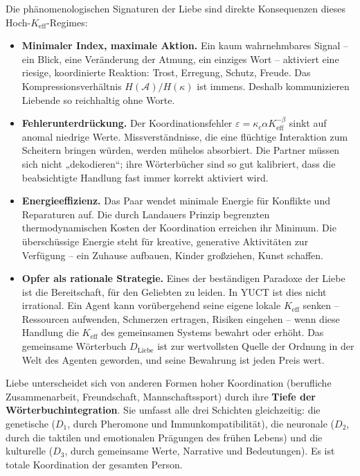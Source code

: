 \documentclass[12pt,a4paper]{article}
\begin{document}
	Die phänomenologischen Signaturen der Liebe sind direkte Konsequenzen dieses Hoch-\(K_{\mathrm{eff}}\)-Regimes:
	
	\begin{itemize}[leftmargin=*]
		\item \textbf{Minimaler Index, maximale Aktion.} Ein kaum wahrnehmbares Signal – ein Blick, eine Veränderung der Atmung, ein einziges Wort – aktiviert eine riesige, koordinierte Reaktion: Trost, Erregung, Schutz, Freude. Das Kompressionsverhältnis \(H(\mathcal{A}) / H(\kappa)\) ist immens. Deshalb kommunizieren Liebende so reichhaltig ohne Worte.
		\item \textbf{Fehlerunterdrückung.} Der Koordinationsfehler \(\varepsilon = \kappa_c \alpha K_{\mathrm{eff}}^{-\beta}\) sinkt auf anomal niedrige Werte. Missverständnisse, die eine flüchtige Interaktion zum Scheitern bringen würden, werden mühelos absorbiert. Die Partner müssen sich nicht „dekodieren“; ihre Wörterbücher sind so gut kalibriert, dass die beabsichtigte Handlung fast immer korrekt aktiviert wird.
		\item \textbf{Energieeffizienz.} Das Paar wendet minimale Energie für Konflikte und Reparaturen auf. Die durch Landauers Prinzip begrenzten thermodynamischen Kosten der Koordination erreichen ihr Minimum. Die überschüssige Energie steht für kreative, generative Aktivitäten zur Verfügung – ein Zuhause aufbauen, Kinder großziehen, Kunst schaffen.
		\item \textbf{Opfer als rationale Strategie.} Eines der beständigen Paradoxe der Liebe ist die Bereitschaft, für den Geliebten zu leiden. In YUCT ist dies nicht irrational. Ein Agent kann vorübergehend seine eigene lokale \(K_{\mathrm{eff}}\) senken – Ressourcen aufwenden, Schmerzen ertragen, Risiken eingehen – wenn diese Handlung die \(K_{\mathrm{eff}}\) des gemeinsamen Systems bewahrt oder erhöht. Das gemeinsame Wörterbuch \(D_{\text{Liebe}}\) ist zur wertvollsten Quelle der Ordnung in der Welt des Agenten geworden, und seine Bewahrung ist jeden Preis wert.
	\end{itemize}
	
	Liebe unterscheidet sich von anderen Formen hoher Koordination (berufliche Zusammenarbeit, Freundschaft, Mannschaftssport) durch ihre \textbf{Tiefe der Wörterbuchintegration}. Sie umfasst alle drei Schichten gleichzeitig: die genetische (\(D_1\), durch Pheromone und Immunkompatibilität), die neuronale (\(D_2\), durch die taktilen und emotionalen Prägungen des frühen Lebens) und die kulturelle (\(D_3\), durch gemeinsame Werte, Narrative und Bedeutungen). Es ist totale Koordination der gesamten Person.
	
\end{document}
